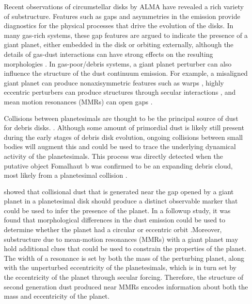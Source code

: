 \documentclass[twocolumn]{aastex63}
\begin{document}
Recent observations of circumstellar disks by ALMA have revealed a rich variety of substructure. Features such as gaps and asymmetries 
\citep{2015ApJ...808L...3A, 2016Sci...353.1519P, PhysRevLett.117.251101, 2016ApJ...820L..40A, 2016Natur.535..258C} in the emission provide 
diagnostics for the physical processes that drive the evolution of the disks. In many gas-rich systems, these gap features are argued to indicate the 
presence of a giant planet, either embedded in the disk \citep{2015MNRAS.453L..73D} or orbiting externally, although the details of gas-dust 
interactions can have strong effects on the resulting morphologies
\citep{2018ApJ...866..110D}. In gas-poor/debris systems, a giant
planet perturber can also influence 
the structure of the dust continuum emission. For example, a misaligned giant planet can produce nonaxisymmetric features such as warps 
\citep{2001A&A...370..447A}, highly eccentric perturbers can produce structures through secular interactions 
\citep{2014MNRAS.443.2541P, 2015MNRAS.448.3679P}, and mean motion resonances (MMRs) can open gaps
\citep{2015ApJ...798...83N, 2016ApJ...818..159T, 2018ApJ...857....3T}.

Collisions between planetesimals are thought to be the principal source of dust for debris disks. \citep[see][]{2008ARA&A..46..339W}.  Although some 
amount of primordial dust is likely still present during the early stages of debris disk evolution, ongoing collisions between small bodies will augment 
this and could be used to trace the underlying dynamical activity of the planetesimals. This process was directly detected when the putative object 
Fomalhaut b was confirmed to be an expanding debris cloud, most likely from a planetesimal collision \citep{2020PNAS..117.9712G}. 

\citet{2013ApJ...777L..31D} showed that collisional dust that is generated near the gap opened by a giant planet in a planetesimal disk should 
produce a distinct observable marker that could be used to infer the presence of the planet. In a followup study, it was found that morphological 
differences in the dust emission could be used to determine whether the planet had a circular or eccentric orbit \citep{2016ApJ...820...29D}.Moreover, 
substructure due to mean-motion resonances (MMRs) with a giant planet may hold additional clues that could be used to constrain the properties of 
the planet.  The width of a resonance is set by both the mass of the perturbing planet, along with the unperturbed eccentricity of the planetesimals, 
which is in turn set by the eccentricity of the planet through secular forcing. Therefore, the structure of second generation dust produced near MMRs 
encodes information about both the mass and eccentricity of the planet.
\end{document}
